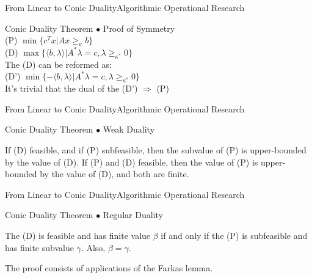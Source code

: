 \documentclass[11pt,aspectratio=169]{beamer}
\newcommand{\TT}{From Linear to Conic Duality}
\newcommand{\TL}{Algorithmic Operational Research}
\newcommand{\PI}{Conic Duality Theorem}
\begin{document}
\begin{frame}{\TT}{\TL}
 \begin{block}{\PI}
\Large
$\bullet$ Proof of Symmetry \newline \\
\hspace{3mm}
(P)\hspace{1mm} $\min\{c^Tx|Ax \geq_\kappa b \}$ \\
\hspace{3mm}
(D) $\max\{\langle b, \lambda \rangle | A^*\lambda = c, \lambda \geq_{\kappa^*} 0 \}$ \newline \\
\hspace{3mm} The (D) can be reformed as:\\ \hspace{13mm} (D') $\min\{-\langle b, \lambda \rangle | A^*\lambda = c, \lambda \geq_{\kappa^*} 0 \}$ \newline \\
\hspace{4mm} It's trivial that the dual of the (D') $\Rightarrow$ (P) \\
 \end{block}
\end{frame}

\begin{frame}{\TT}{\TL}
 \begin{block}{\PI}
\Large
$\bullet$ Weak Duality \newline \\
\begin{Theorem} If (D) feasible, and if (P) subfeasible, then the subvalue of (P) is upper-bounded by the value of (D). \newline
If (P) and (D) feasible, then the value of (P) is upper-bounded by the value of (D), and both are finite.
\end{Theorem}
 \end{block}
\end{frame}

\begin{frame}{\TT}{\TL}
 \begin{block}{\PI}
\Large
$\bullet$ Regular Duality \newline \\
\begin{Theorem} The (D) is feasible and has finite value $\beta$ if and only if the (P) is subfeasible and has finite subvalue $\gamma$. Also, $\beta = \gamma$. \newline \\

\end{Theorem}
The proof consists of applications of the Farkas lemma.
 \end{block}
\end{frame}
\end{document}
